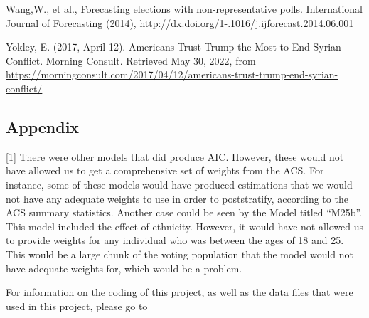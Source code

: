 \documentclass[
  11pt,
]{article}
\begin{document}
Wang,W., et al., Forecasting elections with non-representative polls.
International Journal of Forecasting (2014),
\url{http://dx.doi.org/1-.1016/j.ijforecast.2014.06.001}

Yokley, E. (2017, April 12). Americans Trust Trump the Most to End
Syrian Conflict. Morning Consult. Retrieved May 30, 2022, from
\url{https://morningconsult.com/2017/04/12/americans-trust-trump-end-syrian-conflict/}

\newpage

\hypertarget{appendix}{%
\subsection{Appendix}\label{appendix}}

{[}1{]} There were other models that did produce AIC. However, these
would not have allowed us to get a comprehensive set of weights from the
ACS. For instance, some of these models would have produced estimations
that we would not have any adequate weights to use in order to
poststratify, according to the ACS summary statistics. Another case
could be seen by the Model titled ``M25b''. This model included the
effect of ethnicity. However, it would have not allowed us to provide
weights for any individual who was between the ages of 18 and 25. This
would be a large chunk of the voting population that the model would not
have adequate weights for, which would be a problem.

For information on the coding of this project, as well as the data files
that were used in this project, please go to
\end{document}
